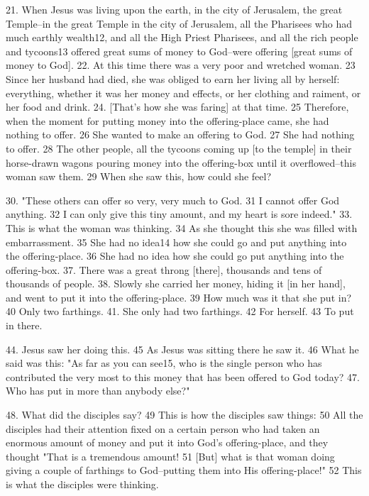 \setcounter{footnote}{0}

21. When Jesus was living upon the earth, in the city of Jerusalem, the great Temple--in
the great Temple in the city of Jerusalem, all the Pharisees who had much earthly
wealth12, and all the High Priest Pharisees, and all the rich people and tycoons13
offered great sums of money to God--were offering [great sums of money to God].
22. At this time there was a very poor and wretched woman. 23 Since her husband
had died, she was obliged to earn her living all by herself: everything, whether
it was her money and effects, or her clothing and raiment, or her food and drink.
24. [That's how she was faring] at that time. 25 Therefore, when the moment for
putting money into the offering-place came, she had nothing to offer. 26 She wanted
to make an offering to God. 27 She had nothing to offer. 28 The other people, all
the tycoons coming up [to the temple] in their horse-drawn wagons pouring money
into the offering-box until it overflowed--this woman saw them. 29 When she saw
this, how could she feel?

30. "These others can offer so very, very much to God. 31 I cannot offer
God anything. 32 I can only give this tiny amount, and my heart is sore indeed."
33. This is what the woman was thinking. 34 As she thought this she was filled with
embarrassment. 35 She had no idea14 how she could go and put anything into the
offering-place. 36 She had no idea how she could go put anything into the offering-box.
37. There was a great throng [there], thousands and tens of thousands of people.
38. Slowly she carried her money, hiding it [in her hand], and went to put it into
the offering-place. 39 How much was it that she put in? 40 Only two farthings.
41. She only had two farthings. 42 For herself. 43 To put in there.

44. Jesus saw her doing this. 45 As Jesus was sitting there he saw it. 46 What he
said was this: "As far as you can see15, who is the single person who
has contributed the very most to this money that has been offered to God today?
47. Who has put in more than anybody else?"

48. What did the disciples say? 49 This is how the disciples saw things: 50 All
the disciples had their attention fixed on a certain person who had taken an enormous
amount of money and put it into God's offering-place, and they thought "That
is a tremendous amount! 51 [But] what is that woman doing giving a couple of farthings
to God--putting them into His offering-place!" 52 This is what the disciples
were thinking.

